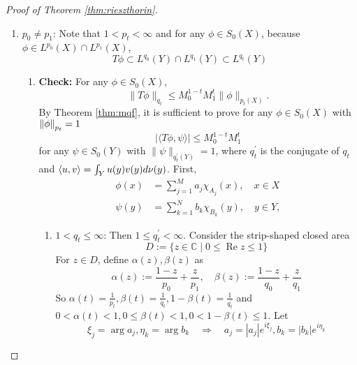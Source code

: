 \begin{proof}[Proof of Theorem \ref{thm:rieszthorin}]
\begin{enumerate}[label=(\Roman*)]
		\item $p_0 \neq p_1$: Note that $1 < p_t < \infty$ and for any $\phi \in S_0(X)$, because $\phi \in L^{p_0}(X) \cap L^{p_1}(X)$, 
		\begin{equation*}
			T\phi \subset L^{q_0}(Y) \cap L^{q_1}(Y) \subset L^{q_t}(Y)
		\end{equation*}
		\begin{enumerate}[label=\theenumi-\arabic{*}]
			\item \textbf{Check:} For any $\phi \in S_0(X)$,
			\begin{equation*}
				\|T \phi\|_{q_t} \leq M_0^{1-t} M_1^t\|\phi\|_{p_t(X)} .
			\end{equation*}
			By Theorem \ref{thm:mqf}, it is sufficient to prove for any $\phi \in S_0(X)$ with $\left\lVert\phi\right\lVert_{p_t} = 1$
			\begin{equation*}
				|\langle T \phi, \psi\rangle| \leq M_0^{1-t} M_1^t
			\end{equation*}
			for any $\psi \in S_0(Y)$ with $\|\psi\|_{q_t^{\prime}(Y)}=1$, where $q_t^{\prime}$ is the conjugate of $q_t$ and $\langle u,v \rangle = \int_Y u(y)v(y)d\nu(y)$. First,
			\begin{equation*}
				\begin{aligned}
					\phi(x) & =\sum_{j=1}^M a_j \chi_{A_j}(x), \quad x \in X \\
					\psi(y) & =\sum_{k=1}^N b_k \chi_{B_k}(y), \quad y \in Y ,
				\end{aligned}
			\end{equation*}
			\begin{enumerate}[label=(\roman*)]
				\item $1 < q_t \leq \infty$: Then $1 \leq q_t^\prime < \infty$. Consider the strip-shaped closed area
				\begin{equation*}
					D:=\{z \in \mathbb{C} \mid 0 \leq \operatorname{Re} z \leq 1\}
				\end{equation*}
				For $z \in D$, define $\alpha(z),\beta(z)$ as
				\begin{equation*}
					\alpha(z):=\frac{1-z}{p_0}+\frac{z}{p_1}, \quad \beta(z):=\frac{1-z}{q_0}+\frac{z}{q_1}
				\end{equation*}
				So $\alpha(t)=\frac{1}{p_t}, \beta(t)=\frac{1}{q_t}, 1-\beta(t)=\frac{1}{q_t^{\prime}}$ and $0<\alpha(t)<1, 0 \leq \beta(t)<1, 0<1-\beta(t) \leq 1$. Let
				\begin{equation*}
					\xi_j=\arg a_j, \eta_k=\arg b_k \quad \Rightarrow \quad a_j=\left|a_j\right| e^{i \xi_j}, b_k=\left|b_k\right| e^{i \eta_k}
				\end{equation*}

\end{enumerate}
\end{enumerate}
\end{enumerate}
\end{proof}
